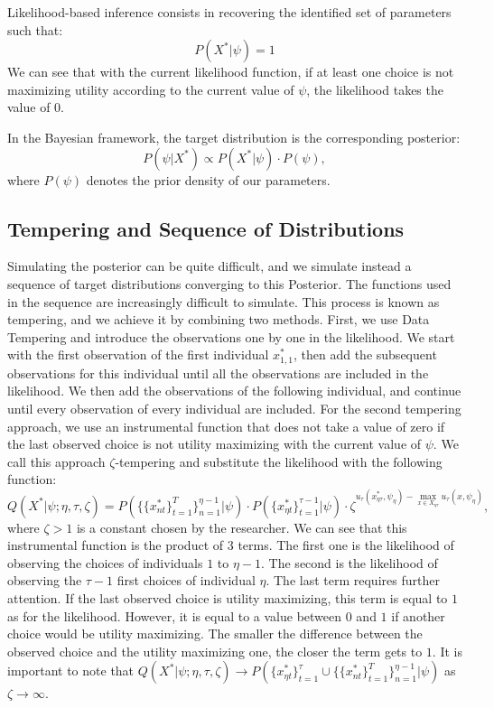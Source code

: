 \documentclass[12pt]{article}
\begin{document}
Likelihood-based inference consists in recovering the identified set of parameters such that: $$P(X^*|\psi) = 1 $$
We can see that with the current likelihood function, if at least one choice is not maximizing utility according to the current value of $\psi$, the likelihood takes the value of $0$.

In the Bayesian framework, the target distribution is the corresponding posterior:
$$  P(\psi|X^*) \propto P(X^*|\psi) \cdot P(\psi),$$
where $P(\psi)$ denotes the prior density of our parameters.

\subsection{Tempering and Sequence of Distributions} 

Simulating the posterior can be quite difficult, and we simulate instead a sequence of target distributions converging to this Posterior. The functions used in the sequence are increasingly difficult to simulate. This process is known as tempering, and we achieve it by combining two methods. First, we use Data Tempering and introduce the observations one by one in the likelihood. We start with the first observation of the first individual $x_{1,1}^*$, then add the subsequent observations for this individual until all the observations are included in the likelihood. We then add the observations of the following individual, and continue until every observation of every individual are included. For the second tempering approach, we use an instrumental function that does not take a value of zero if the last observed choice is not utility maximizing with the current value of $\psi$. We call this approach $\zeta$-tempering and substitute the likelihood with the following function:  
$$Q(X^*|\psi;\eta,\tau,\zeta) = P(\{\{x_{nt}^*\}_{t=1}^T\}_{n=1}^{\eta-1}|\psi) \cdot  P(\{x_{\eta t}^*\}_{t=1}^{\tau-1}|\psi) \cdot \zeta^{ u_\tau(x_{\eta \tau}^*,\psi_\eta) - \max_{x \in X_{\eta \tau}} u_\tau(x,\psi_\eta)},$$
where $\zeta>1$ is a constant chosen by the researcher. We can see that this instrumental function is the product of $3$ terms. The first one is the likelihood of observing the choices of individuals $1$ to $\eta-1$. The second is the likelihood of observing the $\tau-1$ first choices of individual $\eta$. The last term requires further attention. If the last observed choice is utility maximizing, this term is equal to $1$ as for the likelihood. However, it is equal to a value between $0$ and $1$ if another choice would be utility maximizing. The smaller the difference between the observed choice and the utility maximizing one, the closer the term gets to $1$. It is important to note that $Q(X^*|\psi;\eta,\tau,\zeta) \to P(\{x_{\eta t}^*\}_{t=1}^\tau \cup \{\{x_{nt}^*\}_{t=1}^T\}_{n=1}^{\eta-1}|\psi)$ as $\zeta \to \infty$. 
\end{document}
